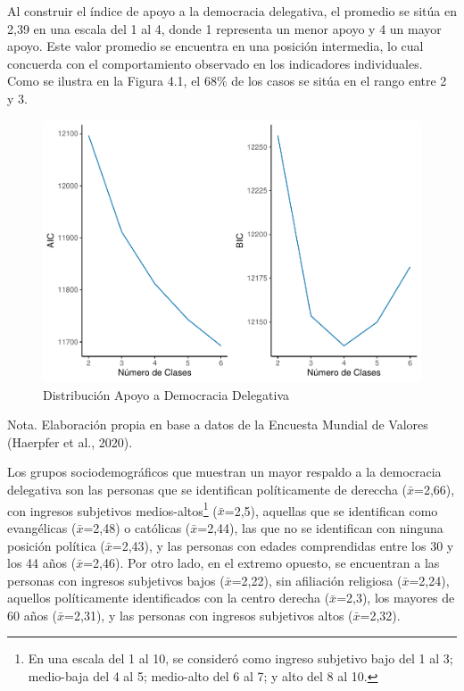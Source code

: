 \documentclass[12pt,twoside]{templates/facsothesis}
\begin{document}
\FloatBarrier

Al construir el índice de apoyo a la democracia delegativa, el promedio se sitúa en 2,39 en una escala del 1 al 4, donde 1 representa un menor apoyo y 4 un mayor apoyo. Este valor promedio se encuentra en una posición intermedia, lo cual concuerda con el comportamiento observado en los indicadores individuales. Como se ilustra en la Figura 4.1, el 68\% de los casos se sitúa en el rango entre 2 y 3.

\begin{figure}[!ht]

{\centering \includegraphics[width=0.8\linewidth,]{tesis_files/figure-latex/unnamed-chunk-9-1} 

}

\caption{Distribución Apoyo a Democracia Delegativa}\label{fig:unnamed-chunk-9}
\end{figure}
\FloatBarrier

Nota. Elaboración propia en base a datos de la Encuesta Mundial de Valores (Haerpfer et al., 2020).

Los grupos sociodemográficos que muestran un mayor respaldo a la democracia delegativa son las personas que se identifican políticamente de dereccha (\(\bar{x}\)=2,66), con ingresos subjetivos medios-altos\footnote{En una escala del 1 al 10, se consideró como ingreso subjetivo bajo del 1 al 3; medio-baja del 4 al 5; medio-alto del 6 al 7; y alto del 8 al 10.} (\(\bar{x}\)=2,5), aquellas que se identifican como evangélicas (\(\bar{x}\)=2,48) o católicas (\(\bar{x}\)=2,44), las que no se identifican con ninguna posición política (\(\bar{x}\)=2,43), y las personas con edades comprendidas entre los 30 y los 44 años (\(\bar{x}\)=2,46). Por otro lado, en el extremo opuesto, se encuentran a las personas con ingresos subjetivos bajos (\(\bar{x}\)=2,22), sin afiliación religiosa (\(\bar{x}\)=2,24), aquellos políticamente identificados con la centro derecha (\(\bar{x}\)=2,3), los mayores de 60 años (\(\bar{x}\)=2,31), y las personas con ingresos subjetivos altos (\(\bar{x}\)=2,32).
\end{document}
